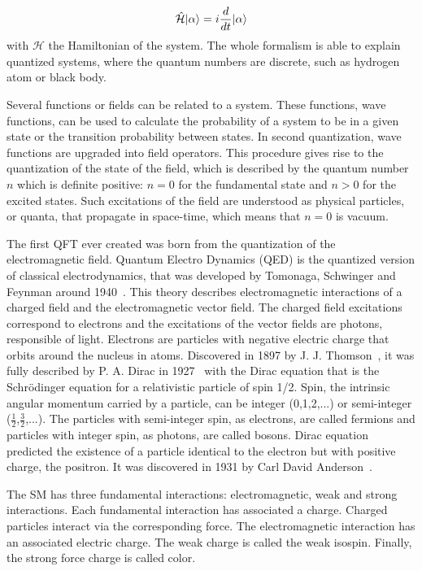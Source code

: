 \begin{equation}
  \label{eq:Schrodinger}
  \hat{\mathcal{H}}| \alpha\rangle=i\frac{d}{dt}| \alpha\rangle
\end{equation}with $\mathcal{H}$ the Hamiltonian of the system. The whole formalism is able to explain quantized systems, where the quantum numbers are discrete, such as hydrogen atom or black body.

Several functions or fields can be related to a system. These functions, wave functions, can be used to calculate the probability of a system to be in a given state or the transition probability between states. In second quantization, wave functions are upgraded into field operators. This procedure gives rise to the quantization of the state of the field, which is described by the quantum number $n$ which is definite positive: $n=0$ for the fundamental state and $n>0$ for the excited states. Such excitations of the field are understood as physical particles, or quanta, that propagate in space-time, which means that $n=0$ is vacuum. 

The first QFT ever created was born from the quantization of the electromagnetic field. Quantum Electro Dynamics (QED) is the quantized version of classical electrodynamics, that was developed by Tomonaga, Schwinger and Feynman around 1940~\cite{Tomonaga:1948zz, Schwinger:1948yk, Feynman:1948ur}. This theory describes electromagnetic interactions of a charged field and the electromagnetic vector field. The charged field excitations correspond to electrons and the excitations of the vector fields are photons, responsible of light. Electrons are particles with negative electric charge that orbits around the nucleus in atoms. Discovered in 1897 by J. J. Thomson~\cite{Thomson:1897cm}, it was fully described by P. A. Dirac in 1927~\cite{Dirac:1927dy} with the Dirac equation that is the Schr\"{o}dinger equation for a relativistic particle of spin 1/2. Spin, the intrinsic angular momentum carried by a particle, can be integer (0,1,2,...) or semi-integer ($\frac{1}{2}$,$\frac{3}{2}$,...). The particles with semi-integer spin, as electrons, are called fermions and particles with integer spin, as photons, are called bosons. Dirac equation predicted the existence of a particle identical to the electron but with positive charge, the positron. It was discovered in 1931 by Carl David Anderson~\cite{Anderson:1933mb}.

The SM has three fundamental interactions: electromagnetic, weak and strong interactions. Each fundamental interaction has associated a charge. Charged particles interact via the corresponding force. The electromagnetic interaction has an associated electric charge. The weak charge is called the weak isospin. Finally, the strong force charge is called color.

